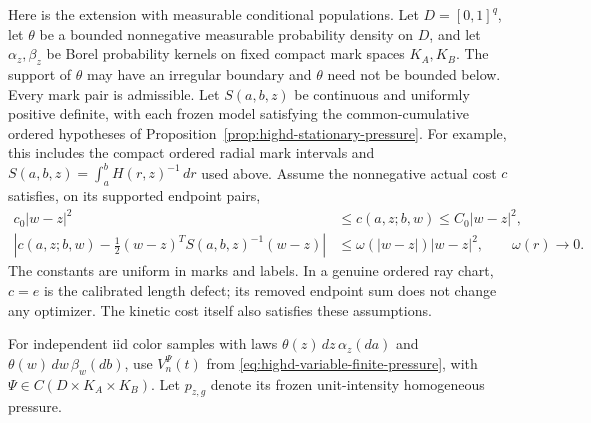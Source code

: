 \documentclass[11pt,reqno]{amsart}
\theoremstyle{definition}
\theoremstyle{remark}
\numberwithin{equation}{section}
\begin{document}
Here is the extension with measurable conditional populations.
Let \(D=[0,1]^q\), let \(\theta\) be a bounded nonnegative measurable
probability density on \(D\), and let \(\alpha_z,\beta_z\) be Borel
probability kernels on fixed compact mark spaces \(K_A,K_B\).
The support of \(\theta\) may have an irregular boundary and
\(\theta\) need not be bounded below. Every mark pair is admissible.
Let \(S(a,b,z)\) be continuous and uniformly positive definite,
with each frozen model satisfying the common-cumulative ordered
hypotheses of Proposition~\ref{prop:highd-stationary-pressure}.
For example, this includes the compact ordered radial mark intervals
and \(S(a,b,z)=\int_a^b H(r,z)^{-1}\,dr\) used above.
Assume the nonnegative actual cost \(c\) satisfies, on its supported
endpoint pairs,
\begin{align}
\label{eq:highd-measurable-comparison}
 c_0|w-z|^2&\le c(a,z;b,w)\le C_0|w-z|^2,\\
\label{eq:highd-measurable-expansion}
 \left|c(a,z;b,w)-\tfrac12(w-z)^TS(a,b,z)^{-1}(w-z)\right|
       &\le\omega(|w-z|)|w-z|^2,
       \qquad \omega(r)\longrightarrow0.
\end{align}
The constants are uniform in marks and labels. In a genuine ordered
ray chart, \(c=e\) is the calibrated length defect; its removed
endpoint sum does not change any optimizer. The kinetic cost itself
also satisfies these assumptions.

For independent iid color samples with laws
\(\theta(z)\,dz\,\alpha_z(da)\) and
\(\theta(w)\,dw\,\beta_w(db)\), use
\(V_n^\Psi(t)\) from \eqref{eq:highd-variable-finite-pressure}, with
\(\Psi\in C(D\times K_A\times K_B)\). Let \(p_{z,g}\) denote
its frozen unit-intensity homogeneous pressure.
\end{document}
